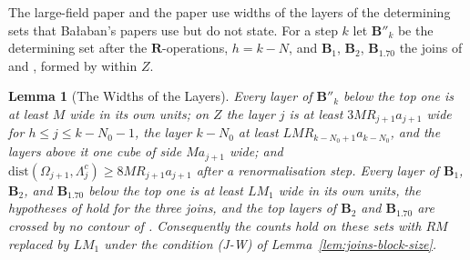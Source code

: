 \documentclass[11pt]{preprint}
\numberwithin{equation}{section}
\newtheorem{lemma}{Lemma}[section]
\theoremstyle{definition}
\theoremstyle{remark}
\theoremstyle{plain}
\begin{document}
The large-field paper and the paper use widths of the layers of the determining sets that Ba{\l}aban's papers use but do not state. For a step $k$ let $\mathbf B''_k$ be the determining set after the $\mathbf R$-operations, $h = k - N$, and $\mathbf B_1$, $\mathbf B_2$, $\mathbf B_{1.70}$ the joins of \cite[p.~371]{BalabanLFR2} and \cite[(1.70)]{BalabanLFR2}, formed by \cite[(2.14), p.~257]{BalabanCRE} within $Z$.

\begin{lemma}[The Widths of the Layers]\label{lem:layer-widths}
Every layer of $\mathbf B''_k$ below the top one is at least $M$ wide in its own units; on $Z$ the layer $j$ is at least $3MR_{j+1}a_{j+1}$ wide for $h \leq j \leq k - N_0 - 1$, the layer $k - N_0$ at least $LMR_{k-N_0+1}a_{k-N_0}$, and the layers above it one cube of side $Ma_{j+1}$ wide; and $\mathrm{dist}(\Omega_{j+1}, \Lambda_j^c) \geq 8MR_{j+1}a_{j+1}$ after a renormalisation step. Every layer of $\mathbf B_1$, $\mathbf B_2$, and $\mathbf B_{1.70}$ below the top one is at least $LM_1$ wide in its own units, the hypotheses of \cite[(2.14)]{BalabanCRE} hold for the three joins, and the top layers of $\mathbf B_2$ and $\mathbf B_{1.70}$ are crossed by no contour of \cite[(2.47)]{BalabanPRT2}. Consequently the counts \cite[(2.57)--(2.61)]{BalabanPRT2} hold on these sets with $RM$ replaced by $LM_1$ under the condition (J-W) of Lemma~\ref{lem:joins-block-size}.
\end{lemma}
\end{document}
